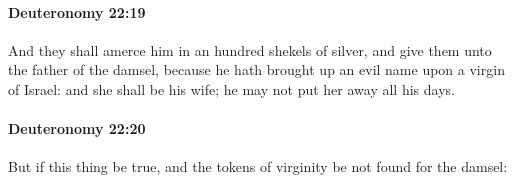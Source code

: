 		\paragraph{Deuteronomy 22:19} %
			\label{DEUTERONOMY-22-19}

			And they shall amerce him in an hundred shekels of silver, and give them unto the father of the damsel, because he hath brought up an evil name upon a virgin of Israel: and she shall be his wife; he may not put her away all his days.


		\paragraph{Deuteronomy 22:20} %
			\label{DEUTERONOMY-22-20}

			But if this thing be true, and the tokens of virginity be not found for the damsel:


